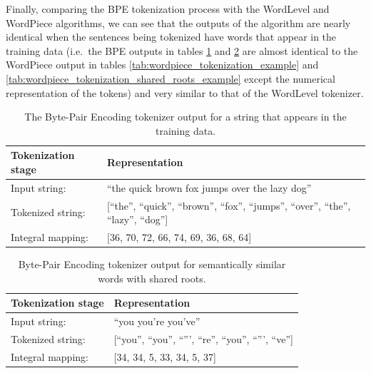 \documentclass[12pt]{article}
\begin{document}
Finally, comparing the BPE tokenization process with the WordLevel and WordPiece algorithms, we can see that the outputs of the algorithm are nearly identical when the sentences being tokenized have words that appear in the training data (i.e.~the BPE outputs in tables \ref{tab:bpe_tokenization_example} and \ref{tab:bpe_shared_roots_example} are almost identical to the WordPiece output in tables \ref{tab:wordpiece_tokenization_example} and \ref{tab:wordpiece_tokenization_shared_roots_example} except the numerical representation of the tokens) and very similar to that of the WordLevel tokenizer.

\begin{table}[!t]
    \centering
    \begin{tabular}{l l}
        \toprule
        Tokenization stage & Representation                                                                            \\
        \midrule
        Input string:      & ``the quick brown fox jumps over the lazy dog''                                           \\
        Tokenized string:  & [``the'', ``quick'', ``brown'', ``fox'', ``jumps'', ``over'', ``the'', ``lazy'', ``dog''] \\
        Integral mapping:  & [36, 70, 72, 66, 74, 69, 36, 68, 64]                                                      \\
        \bottomrule
    \end{tabular}
    \caption{The Byte-Pair Encoding tokenizer output for a string that appears in the training data.}
    \label{tab:bpe_tokenization_example}
\end{table}

\begin{table}[!t]
    \centering
    \begin{tabular}{l l}
        \toprule
        Tokenization stage & Representation                                            \\
        \midrule
        Input string:      & ``you you're you've''                                     \\
        Tokenized string:  & [``you'', ``you'', ``''', ``re'', ``you'', ``''', ``ve''] \\
        Integral mapping:  & [34, 34, 5, 33, 34, 5, 37]                                \\
        \bottomrule
    \end{tabular}
    \caption{Byte-Pair Encoding tokenizer output for semantically similar words with shared roots.}
    \label{tab:bpe_shared_roots_example}
\end{table}
\end{document}
